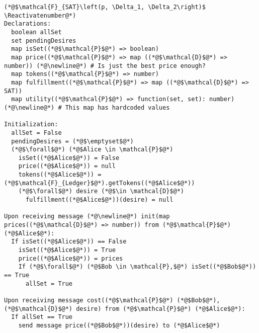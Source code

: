 \Suppressnumber
\begin{lstlisting}[label=satfunc, style=numbers]
(*@$\mathcal{F}_{SAT}\left(p, \Delta_1, \Delta_2\right)$ \Reactivatenumber@*)
Declarations:
  boolean allSet
  set pendingDesires
  map isSet((*@$\mathcal{P}$@*) => boolean)
  map price((*@$\mathcal{P}$@*) => map ((*@$\mathcal{D}$@*) => number)) (*@\newline@*) # Is just the best price enough?
  map tokens((*@$\mathcal{P}$@*) => number)
  map fulfillment((*@$\mathcal{P}$@*) => map ((*@$\mathcal{D}$@*) => SAT))
  map utility((*@$\mathcal{P}$@*) => function(set, set): number) (*@\newline@*) # This map has hardcoded values

Initialization:
  allSet = False
  pendingDesires = (*@$\emptyset$@*)
  (*@$\forall$@*) (*@$Alice \in \mathcal{P}$@*)
    isSet((*@$Alice$@*)) = False
    price((*@$Alice$@*)) = null
    tokens((*@$Alice$@*)) = (*@$\mathcal{F}_{Ledger}$@*).getTokens((*@$Alice$@*))
    (*@$\forall$@*) desire (*@$\in \mathcal{D}$@*)
      fulfillment((*@$Alice$@*))(desire) = null

Upon receiving message (*@\newline@*) init(map prices((*@$\mathcal{D}$@*) => number)) from (*@$\mathcal{P}$@*) (*@$Alice$@*):
  If isSet((*@$Alice$@*)) == False
    isSet((*@$Alice$@*)) = True
    price((*@$Alice$@*)) = prices
    If (*@$\forall$@*) (*@$Bob \in \mathcal{P},$@*) isSet((*@$Bob$@*)) == True
      allSet = True

Upon receiving message cost((*@$\mathcal{P}$@*) (*@$Bob$@*), (*@$\mathcal{D}$@*) desire) from (*@$\mathcal{P}$@*) (*@$Alice$@*):
  If allSet == True
    send message price((*@$Bob$@*))(desire) to (*@$Alice$@*)


\end{lstlisting}

